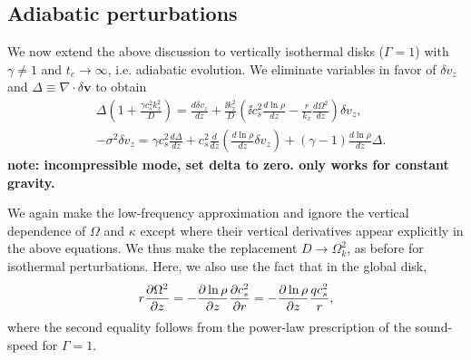 \subsection{Adiabatic perturbations} 
We now extend the above discussion to vertically isothermal disks
($\Gamma=1$) with $\gamma\neq1$ and $t_c\to\infty$, i.e. adiabatic
evolution. We eliminate variables in favor of $\delta v_z$ and
$\Delta \equiv \nabla\cdot\delta\bm{v}$ to obtain
\begin{align}
&\Delta\left(1 + \frac{\gamma c_s^2 k_x^2}{D}\right) = \frac{d\delta
  v_z}{dz} + \frac{\ii k_x^2}{D}\left(\ii c_s^2 \frac{d\ln\rho}{dz}
  - \frac{r}{k_x}\frac{d\Omega^2}{dz}\right)\delta v_z,\label{adia_iso1}\\
& -\sigma^2\delta v_z = \gamma c_s^2 \frac{d\Delta}{dz} +
c_s^2\frac{d}{dz}\left(\frac{d\ln\rho}{dz}\delta v_z\right) +
\left(\gamma-1\right)\frac{d\ln\rho}{dz} \Delta.\label{adia_iso2}
\end{align}
{\bf note: incompressible mode, set delta to zero. only works for
  constant gravity.}

We again make the low-frequency approximation
and ignore the vertical dependence of $\Omega$ and $\kappa$ except
where their vertical derivatives appear explicitly in the above
equations. We thus make the replacement $D\to \Omega_k^2$, as before
for isothermal perturbations. Here, we also use
the fact that in the global disk,
\begin{align}
  r\frac{\partial \Omega^2}{\partial z} = - \frac{\partial\ln\rho}{\partial z}\frac{\partial
    c_s^2}{\partial r} = -\frac{\partial \ln\rho}{\partial z} \frac{qc_s^2}{r},
\end{align}
where the second equality follows from the power-law prescription of
the sound-speed for $\Gamma=1$. 

